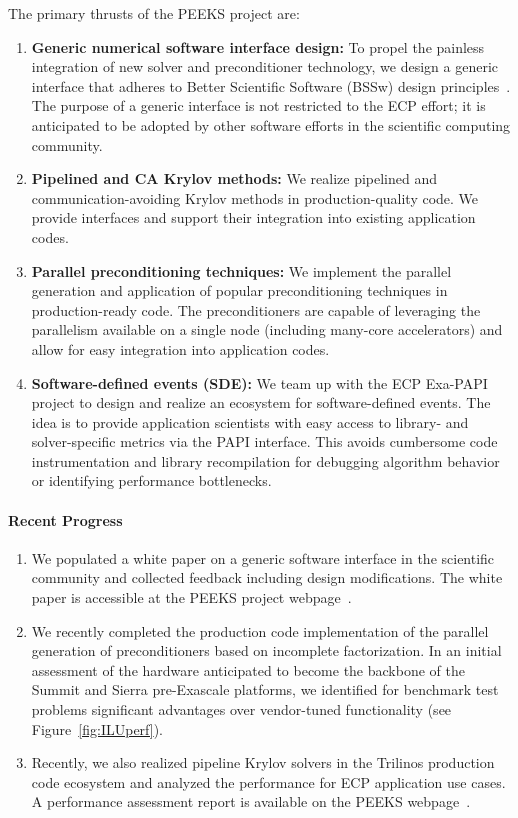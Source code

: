 The primary thrusts of the PEEKS project are:
\begin{enumerate}
    \item \textbf{Generic numerical software interface design:}
	To propel the painless integration of new solver and preconditioner 
	technology, we design a generic interface that adheres to 
	Better Scientific Software (BSSw) design 
	principles~\cite{betterscientificsoftware}.
    The purpose of a generic interface is not restricted to the ECP effort; it is 
    anticipated to be adopted by other software efforts in the scientific 
    computing community.
	\item \textbf{Pipelined and CA Krylov methods:} 
    We realize pipelined and 
	communication-avoiding Krylov methods in production-quality code. We 
	provide interfaces and support their integration into existing application 
	codes.
	\item \textbf{Parallel preconditioning techniques:}  We implement the 
	parallel generation and application of popular preconditioning techniques 
	in production-ready code. The preconditioners are capable of leveraging the 
	parallelism available on a single node (including many-core accelerators) 
	and allow for easy integration into application codes.
    \item \textbf{Software-defined events (SDE):}  We team up with the ECP 
    Exa-PAPI project to design and realize an ecosystem for software-defined 
    events. The idea is to provide application scientists with easy access 
    to library- and solver-specific metrics via the PAPI interface. This 
    avoids cumbersome code instrumentation and library recompilation for 
    debugging algorithm behavior or identifying performance bottlenecks. 
\end{enumerate}

\paragraph{Recent Progress}
\begin{enumerate}
\item 
We populated a white paper on a generic software interface in the scientific 
community and collected feedback including design modifications. The white paper 
is accessible at the PEEKS project webpage~\cite{peekswebpage}.
\item 
We recently completed the production code implementation of the parallel 
generation of preconditioners based on incomplete factorization. In an initial 
assessment of the hardware anticipated to become the backbone of the Summit and 
Sierra pre-Exascale platforms, we identified for benchmark test problems 
significant advantages over vendor-tuned functionality (see 
Figure~\ref{fig:ILUperf}).
\item 
Recently, we also realized pipeline Krylov solvers in the Trilinos 
production code ecosystem and analyzed the performance for ECP application use 
cases. A performance assessment report is available on the PEEKS 
webpage~\cite{peekswebpage}. 
\end{enumerate}

